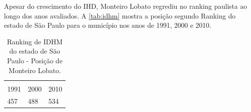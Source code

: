 Apesar do crescimento do IHD, Monteiro Lobato regrediu no ranking paulista ao longo dos anos avaliados. A \autoref{tab:idhm} mostra a posição segundo Ranking do estado de São Paulo para o município nos anos de 1991, 2000 e 2010.
 
\begin{table}[htbp]
	\centering
	\caption{Ranking de IDHM do estado de São Paulo - Posição de Monteiro Lobato.}
	\begin{tabular}{P{1,5cm}|P{1,5cm}|P{1,5cm}}
		 \\
		 1991  & 2000  & 2010 \\
		 457   & 488   & 534 \\
	\end{tabular}%
	\label{tab:idhm}%
\end{table}%

